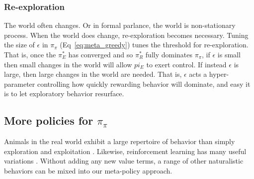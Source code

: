 \documentclass[9pt,twocolumn,twoside]{pnas-new}
\begin{document}



\subsubsection*{Re-exploration}
The world often changes. Or in formal parlance, the world is non-stationary process. When the world does change, re-exploration becomes necessary. Tuning the size of $\epsilon$ in $\pi_{\pi}$ (Eq~\ref{eq:meta_greedy}) tunes the threshold for re-exploration. That is, once the $\pi^*_E$ has converged and so $\pi^*_R$ fully dominates $\pi_{\pi}$, if $\epsilon$ is small then small changes in the world will allow $pi_E$ to exert control. If instead $\epsilon$ is large, then large changes in the world are needed. That is, $\epsilon$ acts a hyper-parameter controlling how quickly rewarding behavior will dominate, and easy it is to let exploratory behavior resurface.

\subsection*{More policies for $\pi_{\pi}$}
Animals in the real world exhibit a large repertoire of behavior than simply exploration and exploitation \cite{TODO}. Likewise, reinforcement learning has many useful variations \cite{Sutton2018}. Without adding any new value terms, a range of other naturalistic behaviors can be mixed into our meta-policy approach. 
\end{document}
